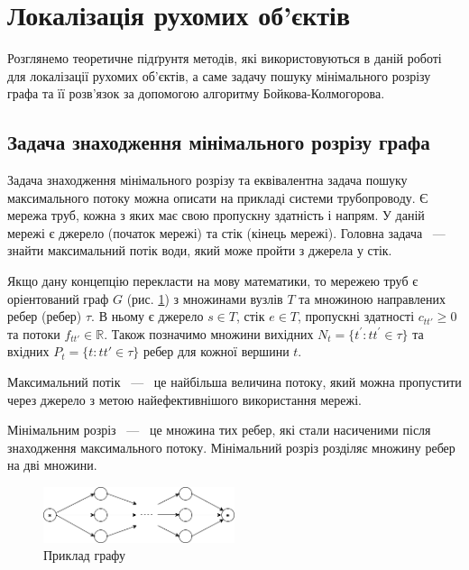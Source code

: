 \section{Локалізація рухомих об'єктів}

Розглянемо теоретичне підґрунтя методів, які використовуються в даній роботі для
локалізації рухомих об'єктів, а саме задачу пошуку мінімального розрізу графа
та її розв'язок за допомогою алгоритму Бойкова-Колмогорова.

\subsection{Задача знаходження мінімального розрізу графа}

Задача знаходження мінімального розрізу та еквівалентна задача пошуку максимального потоку
можна описати на прикладі системи трубопроводу.
Є мережа труб, кожна з яких має свою пропускну здатність і напрям.
У даній мережі є джерело (початок мережі) та стік (кінець мережі).
Головна задача ~---~ знайти максимальний потік води,
який може пройти з джерела у стік.

Якщо дану концепцію перекласти на мову
математики, то мережею труб є оріентований граф $G$ (рис. \ref{fig:graph_example})
з множинами вузлів $T$ та множиною направлених ребер (ребер) $\tau$.
В ньому є джерело $s \in T$, стік $e \in T$, пропускні здатності $c_{tt'} \ge 0$
та потоки $f_{tt'} \in \mathbb{R}$.
Також позначимо множини вихідних $N_t = \{t^{'}: tt^{'} \in \tau \}$
та вхідних $P_t = \{t: tt' \in \tau \}$ ребер для кожної вершини $t$.
\begin{definition}
    Максимальний потік ~---~  це найбільша величина потоку, який
    можна пропустити через джерело з метою найефективнішого  використання мережі.
\end{definition}

\begin{definition}
    Мінімальним розріз ~---~ це множина тих ребер, які стали насиченими після знаходження максимального
    потоку. Мінімальний розріз розділяє множину ребер на дві множини.
\end{definition}
\begin{figure}[H]
    \centering
    \includegraphics[width=0.5\textwidth]{images/graph_example}
    \caption{Приклад графу
        \label{fig:graph_example}
    }
\end{figure}


